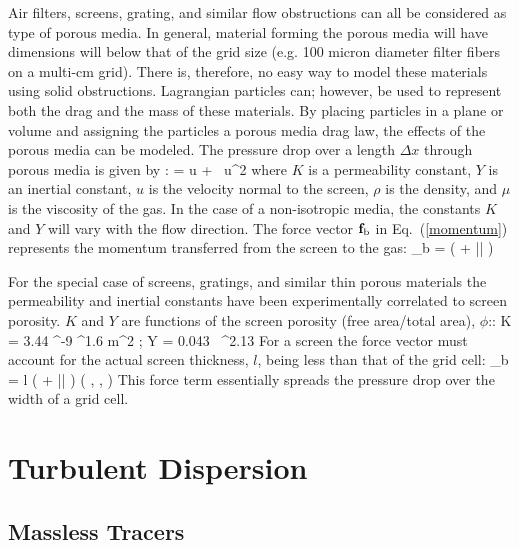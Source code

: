 Air filters, screens, grating, and similar flow obstructions can all be considered
as type of porous media. In general, material forming the porous media will have dimensions will below that of the grid size (e.g. 100 micron diameter filter fibers on a multi-cm grid).  There is, therefore, no easy way to model these materials using solid obstructions. Lagrangian particles can; however, be used to represent both the drag and the mass of these materials. By placing particles in a plane or volume and assigning the particles a porous media drag law, the effects of the porous media can be modeled. The pressure drop over a length $\Delta x$ through porous media is given by \cite{VafaiTien:1981}:
\be
    =   u + \rho {} \, u^2
\ee
where $K$ is a permeability constant, $Y$ is an inertial constant, $u$ is the velocity normal to the screen, $\rho$ is the density, and $\mu$ is the viscosity of the gas. In the case of a non-isotropic media, the constants $K$ and $Y$ will vary with the flow direction.
The force vector ${\mathbf{f}}_{\rm b}$ in Eq.~(\ref{momentum}) represents the momentum transferred from the screen to the gas:
\be
   \bof_{\rm b} = \left(  + \rho {} |\bu| \right) \bu
\ee

For the special case of screens, gratings, and similar thin porous materials the permeability and inertial constants have been experimentally correlated to screen porosity.  $K$ and $Y$ are functions of the screen porosity (free area/total area), $\phi$:\cite{Bartzanas:1}:
\be
   K = 3.44 ^{-9} \; \phi^{1.6} \; \; \hbox{m}^2 \quad ; \quad Y = 0.043 \, \phi^{2.13}
\ee
For a screen the force vector must account for the actual screen thickness, $l$, being less than that of the grid cell:
\be
   \bof_{\rm b} = l \; \left(  + \rho {} |\bu| \right) \left(  ,  ,  \right)
\ee
This force term essentially spreads the pressure drop over the width of a grid cell.


\section{Turbulent Dispersion}

\subsection{Massless Tracers}

